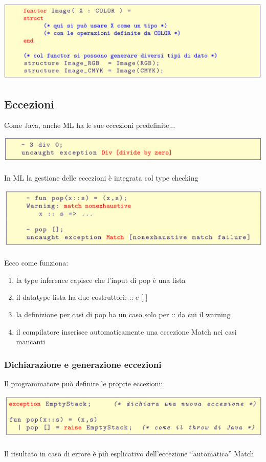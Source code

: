 \documentclass[10pt]{article}
\begin{document}
\includegraphics[scale=0.2]{Immagini/ml50.png}
\subsection{Eccezioni}
Come Java, anche ML ha le sue eccezioni predefinite...

\includegraphics[scale=0.2]{Immagini/ml51.png}
\\\\
In ML la gestione delle eccezioni è integrata col type checking

\includegraphics[scale=0.2]{Immagini/ml52.png}
\\\\
Ecco come funziona:
\begin{enumerate}
    \item la type inference capisce che l’input di pop è una lista
    \item il datatype lista ha due costruttori: :: e [ ]
    \item la definizione per casi di pop ha un caso solo per ::
da cui il warning
\item il compilatore inserisce automaticamente una eccezione Match nei
casi mancanti
\end{enumerate}
\subsubsection{Dichiarazione e generazione eccezioni}
Il programmatore può definire le proprie eccezioni:

\includegraphics[scale=0.2]{Immagini/ml53.png}
\\\\
Il risultato in caso di errore è più esplicativo dell’eccezione
“automatica” Match
\end{document}
